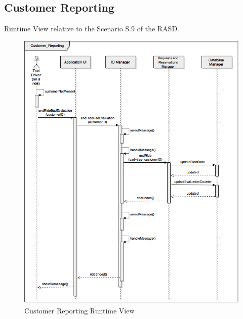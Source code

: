 \documentclass[../../../../../../dd.tex]{subfiles}
\begin{document}
	\subsection{Customer Reporting}
		Runtime View relative to the Scenario S.9 of the RASD.
		\begin{figure}[H]
				\centering
				\includegraphics[width=\textwidth, scale=0.5]{../images/SequenceDiagrams/customerReporting.png}
			\caption{Customer Reporting Runtime View}\label{fig:RuntimeCustomerReporting}
		\end{figure}
		
\end{document}
